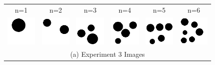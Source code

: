 \documentclass[letterpaper]{article} %
\begin{document}
\begin{figure}[!htbp]%
\centering
\footnotesize
\begin{tabular}{cccccc}
\multicolumn{1}{c}{n=1} \hspace{-12pt} &
\multicolumn{1}{c}{n=2} \hspace{-12pt} &
\multicolumn{1}{c}{n=3} \hspace{-12pt} &
\multicolumn{1}{c}{n=4} \hspace{-12pt} &
\multicolumn{1}{c}{n=5} \hspace{-12pt} &
\multicolumn{1}{c}{n=6} \\

\multicolumn{1}{c}{\includegraphics[width=0.125\linewidth]{images/swap_1.png}} \hspace{-12pt} &
\multicolumn{1}{c}{\includegraphics[width=0.125\linewidth]{images/swap_2.png}} \hspace{-12pt} &
\multicolumn{1}{c}{\includegraphics[width=0.125\linewidth]{images/swap_3.png}} \hspace{-12pt} &
\multicolumn{1}{c}{\includegraphics[width=0.125\linewidth]{images/swap_4.png}} \hspace{-12pt} &
\multicolumn{1}{c}{\includegraphics[width=0.125\linewidth]{images/swap_5.png}} \hspace{-12pt} &
\multicolumn{1}{c}{\includegraphics[width=0.125\linewidth]{images/swap_6.png}} \\
\multicolumn{6}{c}{(a) Experiment 3 Images} \\


\end{tabular}
\end{figure}
\end{document}
